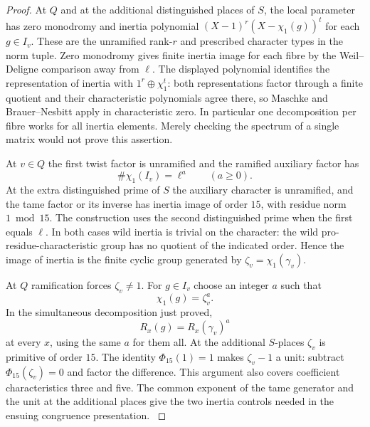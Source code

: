 \begin{proof}
At \(Q\) and at the additional distinguished places of \(S\),
the local parameter has zero monodromy and inertia polynomial
\((X-1)^r(X-\chi_1(g))^t\) for each \(g\in I_v\).
These are the unramified rank-\(r\) and prescribed character
types in the norm tuple. Zero monodromy gives finite inertia
image for each fibre by the Weil--Deligne comparison away from
\(\ell\). The displayed polynomial identifies the representation
of inertia with \(1^r\oplus\chi_1^t\): both representations
factor through a finite quotient and their characteristic
polynomials agree there, so Maschke and Brauer--Nesbitt apply
in characteristic zero. In particular one decomposition per
fibre works for all inertia elements. Merely checking the
spectrum of a single matrix would not prove this assertion.

At \(v\in Q\) the first twist factor is unramified and the ramified auxiliary factor has
\[
 \#\chi_1(I_v)=\ell^a\qquad(a\ge0).
\]
At the extra
distinguished prime of \(S\) the auxiliary character is
unramified, and the tame factor or its inverse has inertia
image of order \(15\), with residue norm \(1\bmod 15\).
The construction uses the second distinguished prime when
the first equals \(\ell\). In both cases wild inertia is
trivial on the character: the wild pro-residue-characteristic
group has no quotient of the indicated order. Hence the image
of inertia is the finite cyclic group generated by
\(\zeta_v=\chi_1(\gamma_v)\).

At \(Q\) ramification forces
\(\zeta_v\ne1\). For \(g\in I_v\) choose an integer \(a\)
such that
\[
 \chi_1(g)=\zeta_v^a.
\]
In the simultaneous
decomposition just proved,
\[
 R_x(g)=R_x(\gamma_v)^a
\]
at every \(x\), using the same
\(a\) for them all. At the additional \(S\)-places
\(\zeta_v\) is primitive of order \(15\).
The identity \(\Phi_{15}(1)=1\) makes \(\zeta_v-1\) a unit:
subtract \(\Phi_{15}(\zeta_v)=0\) and factor the difference.
This argument also covers coefficient characteristics three
and five. The common exponent of the tame generator and the unit at the additional places give the two inertia controls needed in the ensuing congruence presentation. \label{cor:retained-galois-5}
\end{proof}

